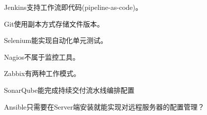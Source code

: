 \begin{problem}
    Jenkins支持工作流即代码(pipeline-as-code)。
\end{problem}


\begin{problem}
    Git使用副本方式存储文件版本。
\end{problem}


\begin{problem}
    Selenium能实现自动化单元测试。
\end{problem}


\begin{problem}
    Nagios不属于监控工具。
\end{problem}


\begin{problem}
    Zabbix有两种工作模式。
\end{problem}


\begin{problem}
    SonarQube能完成持续交付流水线编排配置
\end{problem}



\begin{problem}
    Ansible只需要在Server端安装就能实现对远程服务器的配置管理？
\end{problem}
